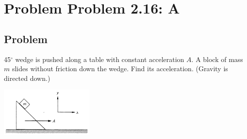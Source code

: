 \documentclass[solutions]{esg8012pset}
\begin{document}
\section*{Problem Problem 2.16: A}
\subsection*{Problem}
 45$^{\circ}$ wedge is pushed along a table with constant acceleration $A$. A block of mass $m$ slides without friction down the wedge. Find its acceleration. (Gravity is directed down.)
  \begin{center}\includegraphics[width=0.35\textwidth]{ps02_4}\end{center}
\end{document}
